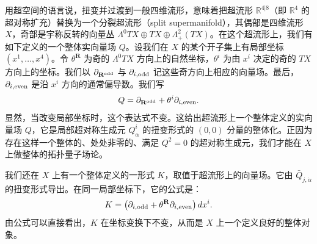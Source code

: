 
用超空间的语言说，扭变并过渡到一般四维流形，意味着把超流形 $\mathbb{R}^{4|8}$（即 $\mathbb{R}^4$ 的超对称扩充）替换为一个分裂超流形（split supermanifold），其偶部是四维流形 $X$，奇部是宇称反转的向量丛 $\Lambda^0TX\oplus TX\oplus\Lambda^2_+(TX)$。在这个超流形上，我们有如下定义的一个整体实向量场 $Q$。设我们在 $X$ 的某个开子集上有局部坐标 $(x^1,\dots,x^4)$。令 $\theta^{\mathbf{R}}$ 为奇的 $\Lambda^0TX$ 方向上的自然坐标，$\theta^i$ 为由 $x^i$ 决定的奇的 $TX$ 方向上的坐标。我们以 $\partial_{\mathbf{R}^{\rm odd}}$ 与 $\partial_{i,{\rm odd}}$ 记这些奇方向上相应的向量场。最后，$\partial_{i,{\rm even}}$ 是沿 $x^i$ 方向的通常偏导数。我们写
\[
Q=\partial_{\mathbf{R}^{\rm odd}}+\theta^i\partial_{i,{\rm even}}.
\]
显然，当改变局部坐标时，这个表达式不变。这给出超流形上一个整体定义的实向量场 $Q$，它是局部超对称生成元 $Q^i_\alpha$ 的扭变形式的 $(0,0)$ 分量的整体化。正因为存在这样一个整体的、处处非零的、满足 $Q^2=0$ 的超对称生成元，我们才能在 $X$ 上做整体的拓扑量子场论。

我们还在 $X$ 上有一个整体定义的一形式 $K$，取值于超流形上的向量场。它由 $\bar Q_{j,\dot\alpha}$ 的扭变形式导出。在同一局部坐标下，它的公式是：
\[
K=\bigl(\partial_{i,{\rm odd}}+\theta^{\mathbf{R}}\partial_{i,{\rm even}}\bigr)\,dx^i.
\]
由公式可以直接看出，$K$ 在坐标变换下不变，从而是 $X$ 上一个定义良好的整体对象。


